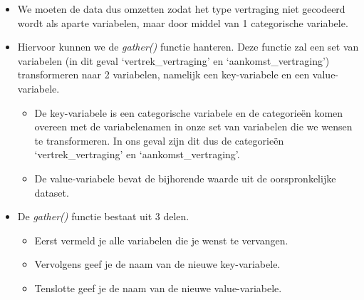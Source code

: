 \documentclass[]{tufte-book}
\newenvironment{Shaded}{}{}
\newcommand{\DataTypeTok}[1]{\textcolor[rgb]{0.56,0.13,0.00}{#1}}
\newcommand{\KeywordTok}[1]{\textcolor[rgb]{0.00,0.44,0.13}{\textbf{#1}}}
\newcommand{\NormalTok}[1]{#1}
\newcommand{\OperatorTok}[1]{\textcolor[rgb]{0.40,0.40,0.40}{#1}}
\newcommand{\StringTok}[1]{\textcolor[rgb]{0.25,0.44,0.63}{#1}}
\providecommand{\tightlist}{%
  \setlength{\itemsep}{0pt}\setlength{\parskip}{0pt}}
\begin{document}
\begin{itemize}
\tightlist
\item
  We moeten de data dus omzetten zodat het type vertraging niet gecodeerd wordt als aparte variabelen, maar door middel van 1 categorische variabele.
\item
  Hiervoor kunnen we de \emph{gather()} functie hanteren. Deze functie zal een set van variabelen (in dit geval `vertrek\_vertraging' en `aankomst\_vertraging') transformeren naar 2 variabelen, namelijk een key-variabele en een value-variabele.

  \begin{itemize}
  \tightlist
  \item
    De key-variabele is een categorische variabele en de categorieën komen overeen met de variabelenamen in onze set van variabelen die we wensen te transformeren. In ons geval zijn dit dus de categorieën `vertrek\_vertraging' en `aankomst\_vertraging'.
  \item
    De value-variabele bevat de bijhorende waarde uit de oorspronkelijke dataset.
  \end{itemize}
\item
  De \emph{gather()} functie bestaat uit 3 delen.

  \begin{itemize}
  \tightlist
  \item
    Eerst vermeld je alle variabelen die je wenst te vervangen.
  \item
    Vervolgens geef je de naam van de nieuwe key-variabele.
  \item
    Tenslotte geef je de naam van de nieuwe value-variabele.
  \end{itemize}
\end{itemize}

\begin{Shaded}
\end{Shaded}
\end{document}
